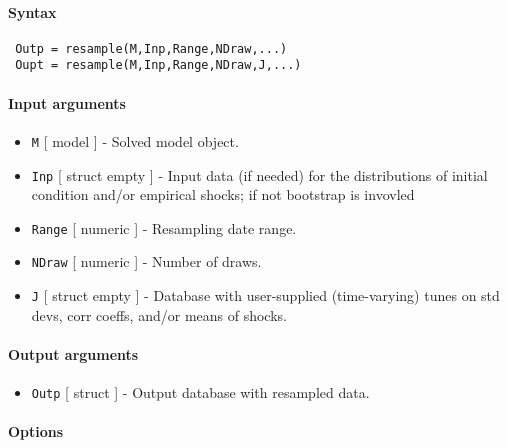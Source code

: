 


	\paragraph{Syntax}
 
 \begin{verbatim}
 Outp = resample(M,Inp,Range,NDraw,...)
 Oupt = resample(M,Inp,Range,NDraw,J,...)
 \end{verbatim}
 
 \paragraph{Input arguments}
 
 \begin{itemize}
 \item
   \texttt{M} {[} model {]} - Solved model object.
 \item
   \texttt{Inp} {[} struct \textbar{} empty {]} - Input data (if needed)
   for the distributions of initial condition and/or empirical shocks; if
   not bootstrap is invovled
 \item
   \texttt{Range} {[} numeric {]} - Resampling date range.
 \item
   \texttt{NDraw} {[} numeric {]} - Number of draws.
 \item
   \texttt{J} {[} struct \textbar{} empty {]} - Database with
   user-supplied (time-varying) tunes on std devs, corr coeffs, and/or
   means of shocks.
 \end{itemize}
 
 \paragraph{Output arguments}
 
 \begin{itemize}
 \item
   \texttt{Outp} {[} struct {]} - Output database with resampled data.
 \end{itemize}
 
 \paragraph{Options}
 
